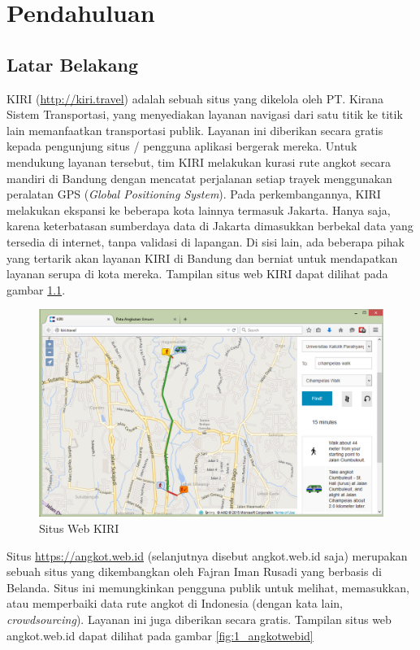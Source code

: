 \chapter{Pendahuluan}

\section{Latar Belakang}

KIRI (\url{http://kiri.travel}) adalah sebuah situs yang dikelola oleh PT. Kirana Sistem Transportasi, yang menyediakan layanan navigasi dari satu titik ke titik lain memanfaatkan transportasi publik. Layanan ini diberikan secara gratis kepada pengunjung situs / pengguna aplikasi bergerak mereka. Untuk mendukung layanan tersebut, tim KIRI melakukan kurasi rute angkot secara mandiri di Bandung dengan mencatat perjalanan setiap trayek menggunakan peralatan GPS (\textit{Global Positioning System}). Pada perkembangannya, KIRI melakukan ekspansi ke beberapa kota lainnya termasuk Jakarta. Hanya saja, karena keterbatasan sumberdaya data di Jakarta dimasukkan berbekal data yang tersedia di internet, tanpa validasi di lapangan. Di sisi lain, ada beberapa pihak yang tertarik akan layanan KIRI di Bandung dan berniat untuk mendapatkan layanan serupa di kota mereka. Tampilan situs web KIRI dapat dilihat pada gambar \ref{fig:1_kiri}.

\begin{figure}
	\centering
	\includegraphics[scale=0.5]{Gambar/1_kiri}
	\caption{Situs Web KIRI} 
	\label{fig:1_kiri}
\end{figure}

Situs \url{https://angkot.web.id} (selanjutnya disebut angkot.web.id saja) merupakan sebuah situs yang dikembangkan oleh Fajran Iman Rusadi yang berbasis di Belanda. Situs ini memungkinkan pengguna publik untuk melihat, memasukkan, atau memperbaiki data rute angkot di Indonesia (dengan kata lain, \textit{crowdsourcing}). Layanan ini juga diberikan secara gratis. Tampilan situs web angkot.web.id dapat dilihat pada gambar \ref{fig:1_angkotwebid}

